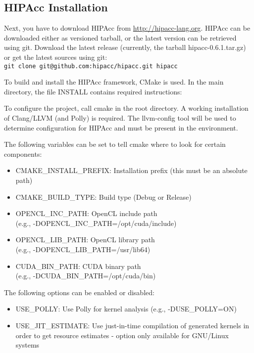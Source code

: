 \subsection{\ac{HIPAcc} Installation}
Next, you have to download \ac{HIPAcc} from
\href{http://hipacc-lang.org}{http://hipacc-lang.org}.
\ac{HIPAcc} can be downloaded either as versioned tarball, or the latest version
can be retrieved using git. Download the latest release (currently, the tarball
hipacc-0.6.1.tar.gz) or get the latest sources using git:\\
{\tt git clone git@github.com:hipacc/hipacc.git hipacc}

To build and install the \ac{HIPAcc} framework, CMake is used. In the main
directory, the file INSTALL contains required instructions:

To configure the project, call cmake in the root directory. A working
installation of Clang/LLVM (and Polly) is required. The llvm-config tool will be
used to determine configuration for \ac{HIPAcc} and must be present in the
environment.

The following variables can be set to tell cmake where to look for certain components:
\begin{itemize}
    \item CMAKE\_INSTALL\_PREFIX:   Installation prefix (this must be an absolute path)
    \item CMAKE\_BUILD\_TYPE:       Build type (Debug or Release)
    \item OPENCL\_INC\_PATH:        OpenCL include path\\(e.g., -DOPENCL\_INC\_PATH=/opt/cuda/include)
    \item OPENCL\_LIB\_PATH:        OpenCL library path\\(e.g., -DOPENCL\_LIB\_PATH=/usr/lib64)
    \item CUDA\_BIN\_PATH:          CUDA binary path\\(e.g., -DCUDA\_BIN\_PATH=/opt/cuda/bin)
\end{itemize}

The following options can be enabled or disabled:
\begin{itemize}
    \item USE\_POLLY: Use Polly for kernel analysis (e.g., -DUSE\_POLLY=ON)
    \item USE\_JIT\_ESTIMATE: Use just-in-time compilation of generated kernels
    in order to get resource estimates - option only available for GNU/Linux
    systems
\end{itemize}

